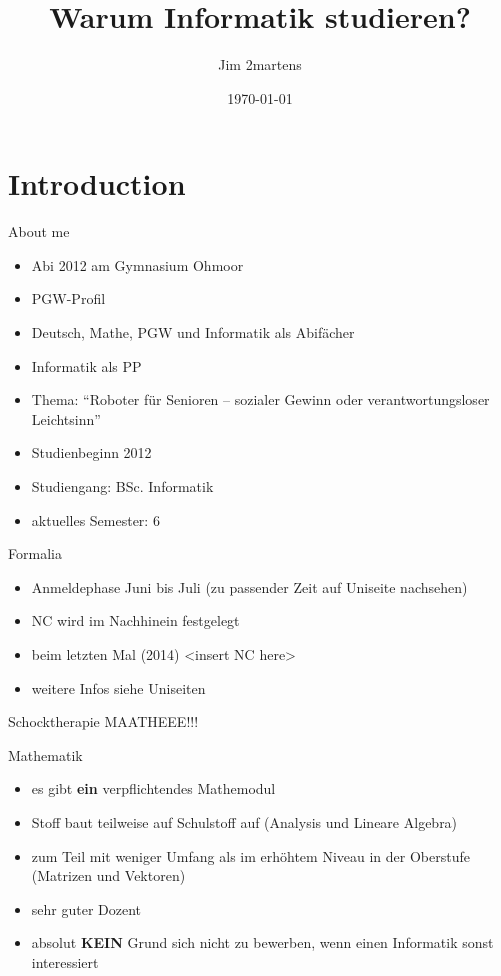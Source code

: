 \documentclass{beamer}
\begin{document}
\author{Jim 2martens}
\title{Warum Informatik studieren?}
\date{\today}

\begin{frame}
    \titlepage\end{frame}

\begin{frame}
    \tableofcontents
\end{frame}

\section{Introduction}
\begin{frame}{About me}
    \begin{itemize}
      \item Abi 2012 am Gymnasium Ohmoor
      \item PGW-Profil
      \item Deutsch, Mathe, PGW und Informatik als Abifächer
      \item Informatik als PP
      \item Thema: "`Roboter für Senioren – sozialer Gewinn oder
verantwortungsloser Leichtsinn"'
      \item Studienbeginn 2012
      \item Studiengang: BSc. Informatik
      \item aktuelles Semester: 6
    \end{itemize}
\end{frame}

\begin{frame}{Formalia}
  \begin{itemize}
    \item Anmeldephase Juni bis Juli (zu passender Zeit auf Uniseite nachsehen)
    \item NC wird im Nachhinein festgelegt
    \item beim letzten Mal (2014) <insert NC here>
    \item weitere Infos siehe Uniseiten
  \end{itemize}
\end{frame}

\begin{frame}{Schocktherapie}
  \centering
  MAATHEEE!!!
\end{frame}
\begin{frame}{Mathematik}
  \begin{itemize}
    \item es gibt \textbf{ein} verpflichtendes Mathemodul
    \item Stoff baut teilweise auf Schulstoff auf (Analysis und Lineare Algebra)
    \item zum Teil mit weniger Umfang als im erhöhtem Niveau in der Oberstufe (Matrizen und Vektoren)
    \item sehr guter Dozent
    \item absolut \textbf{KEIN} Grund sich nicht zu bewerben, wenn einen Informatik sonst interessiert
  \end{itemize}
\end{frame}
\end{document}
